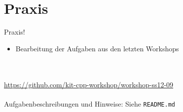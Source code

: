 \section{Praxis}
\begin{frame}[fragile]{Praxis!}
	\begin{itemize}
		\item Bearbeitung der Aufgaben aus den letzten Workshops
	\end{itemize}
	\ \\
	\ \\
	\large{\url{https://github.com/kit-cpp-workshop/workshop-ss12-09}} \\
	\ \\
	Aufgabenbeschreibungen und Hinweise: Siehe \verb|README.md|

\end{frame}
